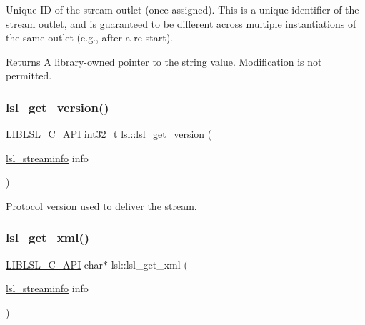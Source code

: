 Unique ID of the stream outlet (once assigned). This is a unique identifier of the stream outlet, and is guaranteed to be different across multiple instantiations of the same outlet (e.\+g., after a re-\/start). \begin{DoxyReturn}{Returns}
A library-\/owned pointer to the string value. Modification is not permitted. 
\end{DoxyReturn}
\mbox{\label{namespacelsl_ab889dd6f9a5fc6d6cd01a0b3dc153387}} 
\subsubsection{\texorpdfstring{lsl\+\_\+get\+\_\+version()}{lsl\_get\_version()}}
{\footnotesize\ttfamily \hyperlink{lsl__cpp_8h_aafd0ef1813e8be84a1420c4f1df64615}{L\+I\+B\+L\+S\+L\+\_\+\+C\+\_\+\+A\+PI} int32\+\_\+t lsl\+::lsl\+\_\+get\+\_\+version (\begin{DoxyParamCaption}\item[{\hyperlink{namespacelsl_aa0a9ce9956061679949daa2e35aae2e8}{lsl\+\_\+streaminfo}}]{info }\end{DoxyParamCaption})}

Protocol version used to deliver the stream. \mbox{\label{namespacelsl_ad1a9b14dccf565e5ecb79c093fe0fd39}} 
\subsubsection{\texorpdfstring{lsl\+\_\+get\+\_\+xml()}{lsl\_get\_xml()}}
{\footnotesize\ttfamily \hyperlink{lsl__cpp_8h_aafd0ef1813e8be84a1420c4f1df64615}{L\+I\+B\+L\+S\+L\+\_\+\+C\+\_\+\+A\+PI} char$\ast$ lsl\+::lsl\+\_\+get\+\_\+xml (\begin{DoxyParamCaption}\item[{\hyperlink{namespacelsl_aa0a9ce9956061679949daa2e35aae2e8}{lsl\+\_\+streaminfo}}]{info }\end{DoxyParamCaption})}

